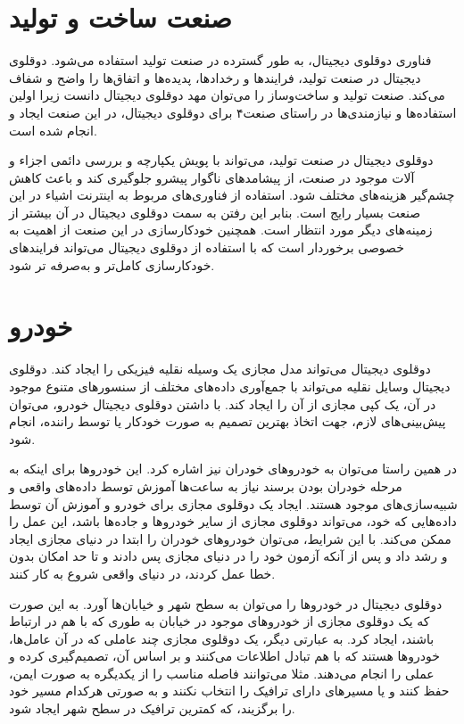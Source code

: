 \section{صنعت ساخت و تولید}
فناوری دوقلوی دیجیتال، به طور گسترده در صنعت تولید استفاده می‌شود. دوقلو‌ی دیجیتال در صنعت تولید، فرایند‌ها و رخداد‌ها، پدیده‌ها و اتفاق‌ها را واضح و شفاف می‌کند. صنعت تولید و ساخت‌وساز را می‌توان مهد دوقلوی دیجیتال دانست زیرا اولین استفاده‌ها و نیازمندی‌ها در راستای صنعت۴ برای دوقلوی دیجیتال، در این صنعت ایجاد و انجام شده‌ است.

دوقلوی دیجیتال در صنعت تولید، می‌تواند با پویش یکپارچه و بررسی دائمی اجزاء و آلات موجود در صنعت، از پیشامد‌های ناگوار پیشرو جلوگیری کند و باعث کاهش چشم‌گیر هزینه‌های مختلف شود. استفاده از فناوری‌های مربوط به اینترنت اشیاء در این صنعت بسیار رایج است. بنابر این رفتن به سمت دوقلوی دیجیتال در آن بیشتر از زمینه‌های دیگر مورد انتظار است. همچنین خودکار‌سازی در این صنعت از اهمیت به خصوصی برخوردار است که با استفاده از دوقلوی دیجیتال می‌تواند فرایند‌های خودکار‌سازی کامل‌تر و به‌صرفه تر شود.


\section{خودرو}
دوقلوی دیجیتال می‌تواند مدل مجازی یک وسیله نقلیه فیزیکی را ایجاد کند. دوقلوی دیجیتال وسایل نقلیه می‌تواند با جمع‌آوری داده‌های مختلف از سنسور‌های متنوع موجود در آن، یک کپی مجازی از آن را ایجاد کند. با داشتن دوقلوی دیجیتال خودرو، می‌توان پیش‌بینی‌های لازم، جهت اتخاذ بهترین تصمیم به صورت خودکار یا توسط راننده، انجام شود. 

در همین راستا می‌توان به خودرو‌های خودران نیز اشاره کرد. این خودرو‌ها برای اینکه به مرحله خودران بودن برسند نیاز به ساعت‌ها آموزش توسط داده‌های واقعی و شبیه‌سازی‌های موجود هستند. ایجاد یک دوقلوی مجازی برای خودرو و آموزش آن توسط داده‌هایی که خود، می‌تواند دوقلوی مجازی از سایر خودرو‌ها و جاده‌ها باشد، این عمل را ممکن می‌کند. با این شرایط، می‌توان خودرو‌های خودران را ابتدا در دنیای مجازی ایجاد و رشد داد و پس از آنکه آزمون خود را در دنیای مجازی پس دادند و تا حد امکان بدون خطا عمل کردند، در دنیای واقعی شروع به کار کنند.

دوقلوی دیجیتال در خودرو‌ها را می‌توان به سطح شهر و خیابان‌ها آورد. به این صورت که یک دوقلوی مجازی از خودرو‌های موجود در خیابان به طوری که با هم در ارتباط باشند، ایجاد کرد. به عبارتی دیگر، یک دوقلوی مجازی چند عاملی که در آن عامل‌ها، خودرو‌ها هستند که با هم تبادل اطلاعات می‌کنند و بر اساس آن،‌ تصمیم‌گیری کرده و عملی را انجام می‌دهند. مثلا می‌توانند فاصله مناسب را از یکدیگره به صورت ایمن، حفظ کنند و یا مسیر‌های دارای ترافیک را انتخاب نکنند و به صورتی هرکدام مسیر خود را برگزیند، که کمترین ترافیک در سطح شهر ایجاد شود.

